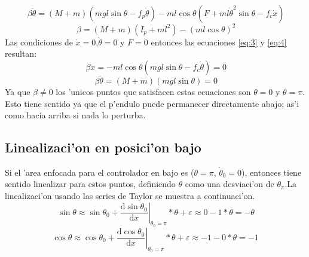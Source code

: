 \begin{equation}\label{eq:4}
\,\beta\ddot{\theta}=(M+m)(mgl\sin{\theta}-f_{p}\dot{\theta})-ml\cos{\theta}(F+ml\dot{\theta}^{2}\sin{\theta}-f_{c}\dot{x}) 
\end{equation}
\begin{equation}\label{eq:5}
\,\beta=(M+m)(I_{p}+ml^{2})-(ml\cos{\theta})^{2} 
\end{equation}
\setlength{\parskip}{0.4cm}
Las condiciones de $\dot{x}=0$,$\dot{\theta}=0$ y $F=0$ entonces las ecuaciones \ref{eq:3} y \ref{eq:4} resultan:\\
\setlength{\parskip}{0pt}
\begin{equation}\label{eq:6}
\,\beta\ddot{x}=-ml\cos{\theta}(mgl\sin{\theta}-f_{c}\dot{\theta})=0
\end{equation}
\begin{equation}\label{eq:7}
\,\beta\ddot{\theta}=(M+m)(mgl\sin{\theta})=0
\end{equation}
\setlength{\parskip}{0.4cm}
Ya que $\beta\neq0$ los 'unicos puntos que satisfacen estas ecuaciones son $\theta=0$ y $\theta=\pi$.
Esto tiene sentido ya que el p'endulo puede permanecer directamente abajo; as'i como hacia arriba si nada lo perturba.

\subsection{Linealizaci'on en posici'on bajo}
Si el 'area enfocada para el controlador en bajo es ($\theta=\pi$, $\dot{\theta}_{0}=0$), entonces tiene sentido linealizar para estos puntos, definiendo $\theta$ como una desviaci'on de $\theta_{\pi}$.La linealizaci'on usando las series de Taylor se muestra a continuaci'on.
\setlength{\parskip}{0pt}
\begin{equation}\label{eq:8}
\,\sin{\theta} \approx \sin{\theta}_{0}+ \left. \frac{\mathrm{d} \sin{\theta}_{0}}{\mathrm{d} x}\right|_{\theta_{0}=\pi} *\theta + \varepsilon \approx 0-1*\theta=-\theta
\end{equation}
\setlength{\parskip}{0.4cm}
\setlength{\parskip}{0pt}
\begin{equation}\label{eq:9}
\cos{\theta} \approx \cos{\theta}_{0}+ \left. \frac{\mathrm{d} \cos{\theta}_{0}}{\mathrm{d} x}\right|_{\theta_{0}=\pi} *\theta + \varepsilon \approx -1-0*\theta=-1
\end{equation}
\setlength{\parskip}{0.4cm}

